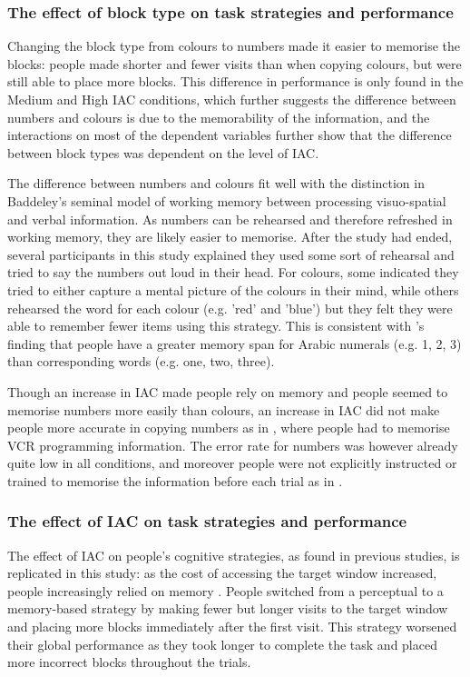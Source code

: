\documentclass[11pt,oneside]{report}
\begin{document}
\begin{table}
\subsubsection{The effect of block type on task strategies and performance}
Changing the block type from colours to numbers made it easier to memorise the blocks: people made shorter and fewer visits than when copying colours, but were still able to place more blocks. This difference in performance is only found in the Medium and High IAC conditions, which further suggests the difference between numbers and colours is due to the memorability of the information, and the interactions on most of the dependent variables further show that the difference between block types was dependent on the level of IAC.

The difference between numbers and colours fit well with the distinction in Baddeley's \citeyearpar{Baddeley1986} seminal model of working memory between processing visuo-spatial and verbal information. As numbers can be rehearsed and therefore refreshed in working memory, they are likely easier to memorise. After the study had ended, several participants in this study explained they used some sort of rehearsal and tried to say the numbers out loud in their head. For colours, some indicated they tried to either capture a mental picture of the colours in their mind, while others rehearsed the word for each colour (e.g. 'red' and 'blue') but they felt they were able to remember fewer items using this strategy. This is consistent with \citet{Chincotta1999}'s finding that people have a greater memory span for Arabic numerals (e.g. 1, 2, 3) than corresponding words (e.g. one, two, three).

Though an increase in IAC made people rely on memory and people seemed to memorise numbers more easily than colours, an increase in IAC did not make people more accurate in copying numbers as in \citet{Gray2004}, where people had to memorise VCR programming information. The error rate for numbers was however already quite low in all conditions, and moreover people were not explicitly instructed or trained to memorise the information before each trial as in \citet{Gray2004}.

\subsubsection{The effect of IAC on task strategies and performance}
The effect of IAC on people's cognitive strategies, as found in previous studies, is replicated in this study: as the cost of accessing the target window increased, people increasingly relied on memory \citep{Gray2006, Morgan2009, Waldron2007}. People switched from a perceptual to a memory-based strategy by making fewer but longer visits to the target window and placing more blocks immediately after the first visit. This strategy worsened their global performance as they took longer to complete the task and placed more incorrect blocks throughout the trials. 


\end{table}
\end{document}
